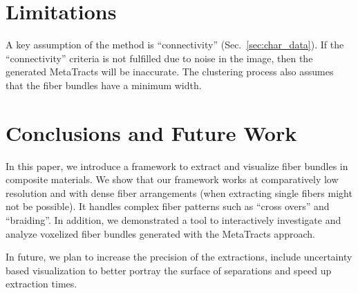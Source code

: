 \section{Limitations}\label{sec:limitations}
A key assumption of the method is ``connectivity'' (Sec.~\ref{sec:char_data}).
If the ``connectivity'' criteria is not fulfilled due to noise in the image, then the generated MetaTracts will be inaccurate. 
The clustering process also assumes that the fiber bundles have a minimum width.
\section{Conclusions and Future Work}\label{subsec:conclusions}
In this paper, we introduce a framework to extract and visualize fiber bundles in composite materials. We show that our framework works at comparatively low resolution and with dense fiber arrangements (when extracting single fibers might not be possible). It handles complex fiber patterns such as ``cross overs'' and ``braiding''.
In addition, we demonstrated a tool to interactively investigate and analyze voxelized fiber bundles generated with the MetaTracts approach.

In future, we plan to increase the precision of the extractions, include uncertainty based visualization to better portray the surface of separations and speed up extraction times.
